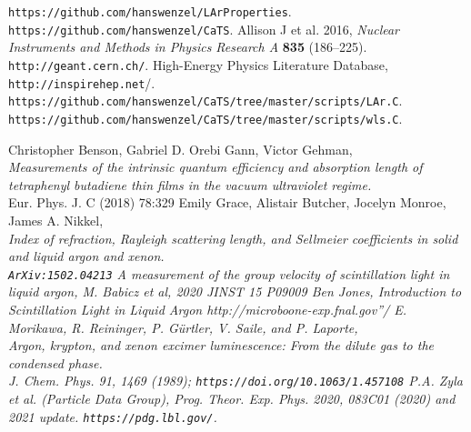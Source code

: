 \documentclass[a4paper]{jpconf}
\begin{document}
 \begin{thebibliography}{99}
   \verb|https://github.com/hanswenzel/LArProperties|.
   \verb|https://github.com/hanswenzel/CaTS|.
 Allison J et al. 2016, {\it Nuclear Instruments and Methods in Physics
                Research A} {\bf 835} (186--225).
 \verb|http://geant.cern.ch/|.
 High-Energy Physics Literature Database,
  \verb"http://inspirehep.net"/.
  \verb|https://github.com/hanswenzel/CaTS/tree/master/scripts/LAr.C|.\\
  \verb|https://github.com/hanswenzel/CaTS/tree/master/scripts/wls.C|.

 Christopher Benson, Gabriel D. Orebi Gann, Victor Gehman,\\
  {\it Measurements of the intrinsic quantum efficiency and absorption
      length of tetraphenyl butadiene thin films in the vacuum
      ultraviolet regime.}\\
Eur. Phys. J. C (2018) 78:329
Emily Grace, Alistair Butcher, Jocelyn Monroe, James A. Nikkel,\\
  \it{Index of refraction, Rayleigh scattering length, and Sellmeier coefficients in solid and liquid argon and xenon.}\\
  \verb|ArXiv:1502.04213|
  \it{A measurement of the group velocity of scintillation light in liquid argon},
  M. Babicz et al, 2020 JINST 15 P09009
  Ben Jones, \it{Introduction to Scintillation Light in Liquid Argon}
  \verb''http://microboone-exp.fnal.gov''/
  E. Morikawa, R. Reininger, P. Gürtler, V. Saile, and P. Laporte,\\
\it{Argon, krypton, and xenon excimer luminescence: From the dilute gas to the
condensed phase.}\\
J. Chem. Phys. 91, 1469 (1989);
  \verb|https://doi.org/10.1063/1.457108|
P.A. Zyla et al. (Particle Data Group), Prog. Theor. Exp. Phys. 2020, 083C01 (2020) and 2021 update.
   \verb|https://pdg.lbl.gov/|.
\end{thebibliography}
\end{document}
